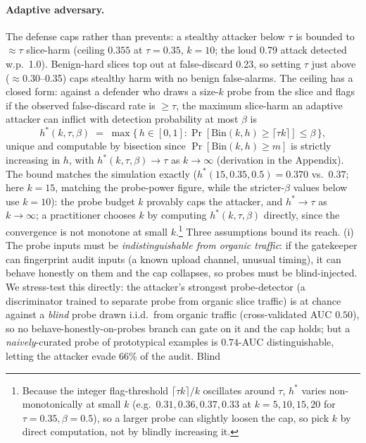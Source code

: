 \documentclass[conference]{IEEEtran}
\begin{document}
\paragraph{Adaptive adversary.} The defense caps rather than prevents: a stealthy attacker below $\tau$ is
bounded to $\approx\tau$ slice-harm (ceiling $0.355$ at $\tau{=}0.35$, $k{=}10$; the loud 0.79 attack detected
w.p.\ 1.0). Benign-hard slices top out at false-discard 0.23, so setting $\tau$ just above ($\approx$0.30--0.35)
caps stealthy harm with no benign false-alarms. The ceiling has a closed form: against a defender who draws a
size-$k$ probe from the slice and flags if the observed false-discard rate is $\geq \tau$, the maximum
slice-harm an adaptive attacker can inflict with detection probability at most $\beta$ is
\begin{equation}\label{eq:ceiling}
h^*(k,\tau,\beta) \;=\; \max\{\, h \in [0,1] : \Pr[\mathrm{Bin}(k,h) \geq \lceil \tau k\rceil] \leq \beta \,\},
\end{equation}
unique and computable by bisection since $\Pr[\mathrm{Bin}(k,h)\geq m]$ is strictly increasing in $h$, with
$h^*(k,\tau,\beta)\to\tau$ as $k\to\infty$ (derivation in the Appendix).
The bound matches the simulation exactly ($h^*(15,0.35,0.5)=0.370$ vs.\ $0.37$; here $k{=}15$,
matching the probe-power figure, while the stricter-$\beta$ values below use $k{=}10$): the probe budget
$k$ provably caps the attacker, and $h^*\!\to\!\tau$ as $k\!\to\!\infty$; a practitioner chooses $k$ by computing
$h^*(k,\tau,\beta)$ directly, since the convergence is not monotone at small $k$.\footnote{Because the integer
flag-threshold $\lceil\tau k\rceil/k$ oscillates around $\tau$, $h^*$ varies non-monotonically at small $k$
(e.g.\ $0.31,0.36,0.37,0.33$ at $k{=}5,10,15,20$ for $\tau{=}0.35,\beta{=}0.5$), so a larger probe can slightly
loosen the cap, so pick $k$ by direct computation, not by blindly increasing it.} Three assumptions bound
its reach. (i) The probe inputs must be \emph{indistinguishable from organic traffic}: if
the gatekeeper can fingerprint audit inputs (a known upload channel, unusual timing), it can behave honestly
on them and the cap collapses, so probes must be blind-injected. We stress-test this directly: the attacker's
strongest probe-detector (a discriminator trained to separate probe from organic slice traffic) is at chance
against a \emph{blind} probe drawn i.i.d.\ from organic traffic (cross-validated AUC $0.50$), so no
behave-honestly-on-probes branch can gate on it and the cap holds; but a \emph{naively}-curated probe of
prototypical examples is $0.74$-AUC distinguishable, letting the attacker evade $66\%$ of the audit. Blind
\end{document}
